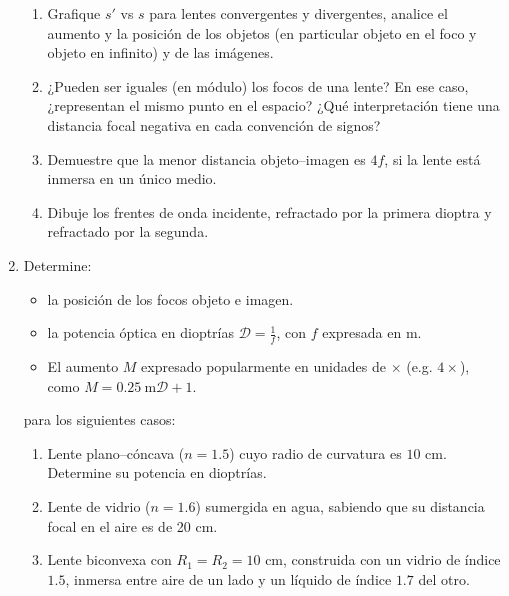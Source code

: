 \documentclass[11pt,spanish]{article}
\begin{document}
\begin{enumerate}
\begin{enumerate}
        \item Grafique $s'$ vs $s$ para lentes convergentes y divergentes,
        analice el aumento y la posición de los objetos (en particular objeto en
        el foco y objeto en infinito) y de las imágenes.
        
        \item ¿Pueden ser iguales (en módulo) los focos de una lente? En ese
        caso, ¿representan el mismo punto en el espacio? ¿Qué interpretación
        tiene una distancia focal negativa en cada convención de signos?
        
        \item Demuestre que la menor distancia objeto--imagen es $4f$, si la
        lente está inmersa en un único medio.
        
        \item Dibuje los frentes de onda incidente, refractado por la primera
        dioptra y refractado por la segunda.
        
    \end{enumerate}

    
    \item Determine:
    \begin{itemize}
        \item la posición de los focos objeto e imagen.
        \item la potencia óptica en dioptrías $\mathcal{D} = \frac{1}{f}$,
        con \(f\) expresada en \si{\metre}.
        \item El aumento \(M\) expresado popularmente en unidades de $\times$
        (e.g. $4\times$), como \(M = \SI{0.25}{\metre} \mathcal{D} + 1\).
    \end{itemize}
    para los siguientes casos:
    \begin{enumerate}
        \item Lente plano--cóncava ($n=1.5$)
        cuyo radio de curvatura es $10$ cm. Determine su potencia en dioptrías.
        
        \item Lente de vidrio ($n=1.6$) sumergida en agua, sabiendo que su
        distancia focal en el aire es de 20 cm.
        
        \item Lente biconvexa con $R_{1}=R_{2}=10$ cm, construida con un vidrio
        de índice $1.5$, inmersa entre aire de un lado y un líquido de índice
        $1.7$ del otro. 
        

\end{enumerate}
\end{enumerate}
\end{document}
